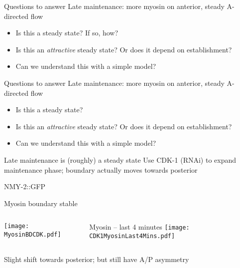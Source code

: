 \documentclass{beamer}
\newcommand{\6}[1]{#1_{\text{6}}}
\newcommand{\3}[1]{#1_{\text{3}}}
\newcommand{\lightgray}[1]{\color{lightgray}#1\normalcolor}
\begin{document}
\begin{frame}{Questions to answer}
Late maintenance: more myosin on anterior, steady A-directed flow
\begin{itemize}\pause
\item Is this a steady state? If so, how? \pause
\item Is this an \emph{attractive} steady state? Or does it depend on establishment? \pause
\item Can we understand this with a simple model?
\end{itemize}
\end{frame}

\begin{frame}{Questions to answer}
Late maintenance: more myosin on anterior, steady A-directed flow
\begin{itemize}
\item Is this a steady state?
\item \lightgray{Is this an \emph{attractive} steady state? Or does it depend on establishment?}
\item \lightgray{ Can we understand this with a simple model?}
\end{itemize}
\end{frame}

\begin{frame}{Late maintenance is (roughly) a steady state}
Use CDK-1 (RNAi) to expand maintenance phase; boundary actually moves towards posterior

\begin{center}
NMY-2::GFP

\end{center}

\end{frame}

\begin{frame}{Myosin boundary stable }
\begin{columns}
\begin{column}{0.4\textwidth}
\texttt{[image: MyosinBDCDK.pdf]}
\end{column}
\begin{column}{0.6\textwidth}
\begin{center}
\phantom{123} Myosin -- last 4 minutes
\texttt{[image: CDK1MyosinLast4Mins.pdf]}
\end{center}
\end{column}
\end{columns}
\vspace{0.5 cm}

Slight shift towards posterior; but still have A/P asymmetry
\end{frame}
\end{document}
